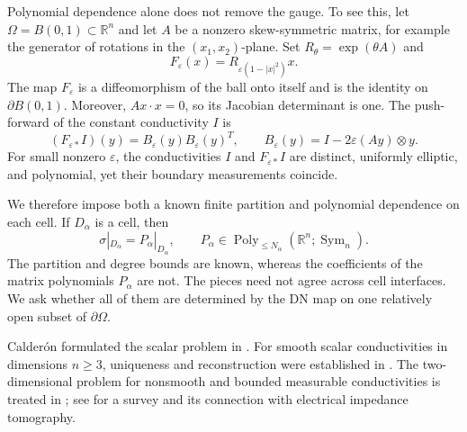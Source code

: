 \documentclass[11pt,oneside]{article}
\newcommand{\R}{\mathbb R}
\newcommand{\Sym}{\operatorname{Sym}}
\newcommand{\eps}{\varepsilon}
\begin{document}
Polynomial dependence alone does not remove the gauge.  To see this, let
\(\Omega=B(0,1)\subset \R^n\) and let \(A\) be a nonzero skew-symmetric
matrix, for example the generator of rotations in the \((x_1,x_2)\)-plane.
Set \(R_\theta=\exp(\theta A)\) and
\begin{equation}
  F_\eps(x)=R_{\eps(1-|x|^2)}x.
  \label{eq:polynomial-gauge-example-map}
\end{equation}
The map \(F_\eps\) is a diffeomorphism of the ball onto itself and is the
identity on \(\partial B(0,1)\).  Moreover, \(Ax\cdot x=0\), so its Jacobian
determinant is one.  The push-forward of the constant conductivity \(I\) is
\begin{equation}
  (F_{\eps*}I)(y)
  =B_\eps(y)B_\eps(y)^T,\qquad
  B_\eps(y)=I-2\eps (Ay)\otimes y.
  \label{eq:polynomial-gauge-example-conductivity}
\end{equation}
For small nonzero \(\eps\), the conductivities \(I\) and \(F_{\eps*}I\) are
distinct, uniformly elliptic, and polynomial, yet their boundary measurements
coincide.


We therefore impose both a known finite partition and polynomial dependence on
each cell.  If \(D_\alpha\) is a cell, then
\begin{equation}
  \sigma|_{D_\alpha}=P_\alpha|_{D_\alpha},
  \qquad
  P_\alpha\in \operatorname{Poly}_{\le N_\alpha}
       (\R^n;\Sym_n).
  \label{eq:piecewise-polynomial}
\end{equation}
The partition and degree bounds are known, whereas the coefficients of the
matrix polynomials \(P_\alpha\) are not.  The pieces need not agree across cell
interfaces.  We ask whether all of them are determined by the DN map on one
relatively open subset of \(\partial\Omega\).

Calder\'on formulated the scalar problem in \cite{Calderon1980}.  For smooth
scalar conductivities in dimensions \(n\ge3\), uniqueness and reconstruction
were established in \cite{SylvesterUhlmann1987,Nachman1988}.  The
two-dimensional problem for nonsmooth and bounded measurable conductivities is
treated in \cite{BrownUhlmann1997,AstalaPaivarinta2006}; see
\cite{Uhlmann2009} for a survey and its connection with electrical impedance
tomography.
\end{document}
